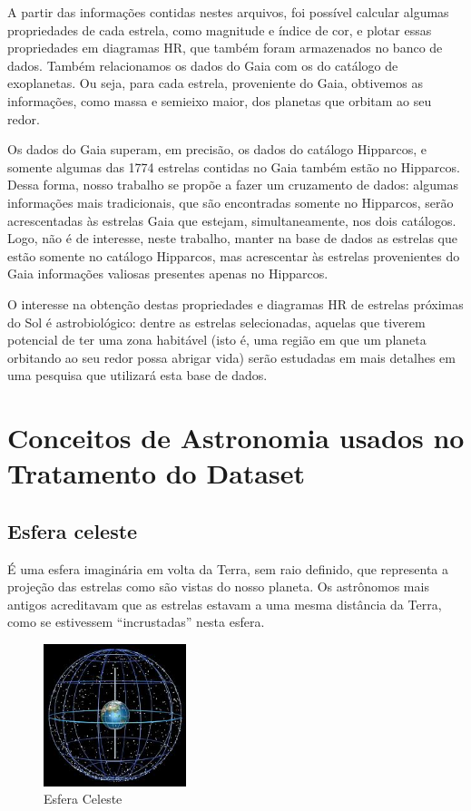 \documentclass[12pt, a4paper]{article}
\begin{document}
	A partir das informações contidas nestes arquivos, foi possível calcular algumas propriedades de cada estrela, como magnitude e índice de cor, e plotar essas propriedades em diagramas HR, que também foram armazenados no banco de dados.
	Também relacionamos os dados do Gaia com os do catálogo de exoplanetas. Ou seja, para cada estrela, proveniente do Gaia, obtivemos as informações, como massa e semieixo maior, dos planetas que orbitam ao seu redor. 
	
	Os dados do Gaia superam, em precisão, os dados do catálogo Hipparcos, e somente algumas das 1774 estrelas contidas no Gaia também estão no Hipparcos. Dessa forma, nosso trabalho se propõe a fazer um cruzamento de dados: algumas informações mais tradicionais, que são encontradas somente no Hipparcos, serão acrescentadas às estrelas Gaia que estejam, simultaneamente, nos dois catálogos. Logo, não é de interesse, neste trabalho, manter na base de dados as estrelas que estão somente no catálogo Hipparcos, mas acrescentar às estrelas provenientes do Gaia informações valiosas presentes apenas no Hipparcos.
	
	O interesse na obtenção destas propriedades e diagramas HR de estrelas próximas do Sol é astrobiológico: dentre as estrelas selecionadas, aquelas que tiverem potencial de ter uma zona habitável (isto é, uma região em que um planeta orbitando ao seu redor possa abrigar vida) serão estudadas em mais detalhes em uma pesquisa que utilizará esta base de dados. 
	
	\section{Conceitos de Astronomia usados no Tratamento do Dataset
	}
	\subsection{Esfera celeste}
	É uma esfera imaginária em volta da Terra, sem raio definido, que representa a projeção das estrelas como são vistas do nosso planeta. Os astrônomos mais antigos acreditavam que as estrelas estavam a uma mesma distância da Terra, como se estivessem “incrustadas” nesta esfera.

	\begin{figure}[h]
		\centering
		\includegraphics[width=0.37\textwidth]{celestial_sphere.png}
		\caption{Esfera Celeste}
		\label{fig:Esfera_Celeste}
	\end{figure}
\end{document}
